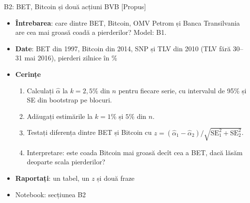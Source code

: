 \begin{frame}{B2: BET, Bitcoin și două acțiuni BVB [Propus]}
\itemsize{\footnotesize}
\begin{itemize}
\item \textbf{Întrebarea}: care dintre BET, Bitcoin, OMV Petrom și Banca Transilvania are cea mai groasă coadă a pierderilor? Model: B1.
\item \textbf{Date}: BET din 1997, Bitcoin din 2014, SNP și TLV din 2010 (TLV fără 30--31 mai 2016), pierderi zilnice în \%
\item \textbf{Cerințe}
\begin{enumerate}
    \item Calculați $\hat\alpha$ la $k = 2{,}5\%$ din $n$ pentru fiecare serie, cu intervalul de 95\% și SE din bootstrap pe blocuri.
    \item Adăugați estimările la $k = 1\%$ și $5\%$ din $n$.
    \item Testați diferența dintre BET și Bitcoin cu $z = (\hat\alpha_1 - \hat\alpha_2)/\sqrt{\mathrm{SE}_1^2 + \mathrm{SE}_2^2}$.
    \item Interpretare: este coada Bitcoin mai groasă decît cea a BET, dacă lăsăm deoparte scala pierderilor?
\end{enumerate}
\item \textbf{Raportați}: un tabel, un $z$ și două fraze
\item Notebook: secțiunea B2
\end{itemize}
\end{frame}

